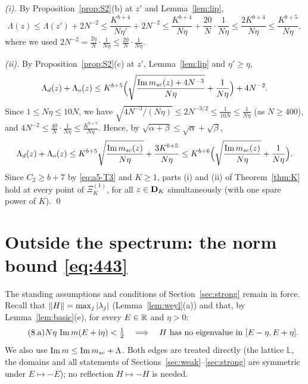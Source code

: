 \emph{\textup{(i)}.} By Proposition~\ref{prop:S2}(b) at $z'$ and Lemma~\ref{lem:lip},
\[
 \Lambda(z)\le\Lambda(z')+2N^{-2}\le\frac{K^{b+4}}{N\eta'}+2N^{-2}\le\frac{K^{b+4}}{N\eta}+\frac{20}{N}\cdot\frac{1}{N\eta}\le\frac{2K^{b+4}}{N\eta}\le\frac{K^{b+5}}{N\eta},
\]
where we used $2N^{-2}=\frac{2\eta}{N}\cdot\frac1{N\eta}\le\frac{20}N\cdot\frac1{N\eta}$.

\emph{\textup{(ii)}.} By Proposition~\ref{prop:S2}(c) at $z'$, Lemma~\ref{lem:lip} and $\eta'\ge\eta$,
\[
 \Lambda_d(z)+\Lambda_o(z)\le K^{b+5}\Big(\sqrt{\frac{\operatorname{Im}m_{sc}(z)+4N^{-3}}{N\eta}}+\frac1{N\eta}\Big)+4N^{-2}.
\]
Since $1\le N\eta\le10N$, we have $\sqrt{4N^{-3}/(N\eta)}\le2N^{-3/2}\le\frac1{10N}\le\frac1{N\eta}$ (as $N\ge400$), and $4N^{-2}\le\frac{40}{N}\cdot\frac1{N\eta}\le\frac{K^{b+5}}{N\eta}$. Hence, by $\sqrt{\alpha+\beta}\le\sqrt\alpha+\sqrt\beta$,
\[
 \Lambda_d(z)+\Lambda_o(z)\le K^{b+5}\sqrt{\frac{\operatorname{Im}m_{sc}(z)}{N\eta}}+\frac{3K^{b+5}}{N\eta}\le K^{b+6}\Big(\sqrt{\frac{\operatorname{Im}m_{sc}(z)}{N\eta}}+\frac1{N\eta}\Big).
\]
Since $C_2\ge b+7$ by \eqref{eq:a5-T3} and $K\ge1$, parts (i) and (ii) of Theorem~\ref{thm:K} hold at every point of $\Xi_K^{(1)}$, for all $z\in\mathbf{D}_K$ simultaneously (with one spare power of $K$). \qed
\section{Outside the spectrum: the norm bound \eqref{eq:443}}\label{sec:norm}
The standing assumptions and conditions of Section~\ref{sec:strong} remain in force. Recall that $\|H\|=\max_j|\lambda_j|$ (Lemma~\ref{lem:weyl}(a)) and that, by Lemma~\ref{lem:basic}(e), for every $E\in\mathbb{R}$ and $\eta>0$:
\begin{equation}\tag{8.a}\label{eq:a5-8a}
 N\eta\,\operatorname{Im} m(E+\mathrm{i}\eta)<\tfrac12\quad\Longrightarrow\quad H\text{ has no eigenvalue in }[E-\eta,E+\eta].
\end{equation}
We also use $\operatorname{Im} m\le\operatorname{Im}m_{sc}+\Lambda$. Both edges are treated directly (the lattice $\mathbb L$, the domains and all statements of Sections~\ref{sec:weak}--\ref{sec:strong} are symmetric under $E\mapsto-E$); no reflection $H\mapsto-H$ is needed.

